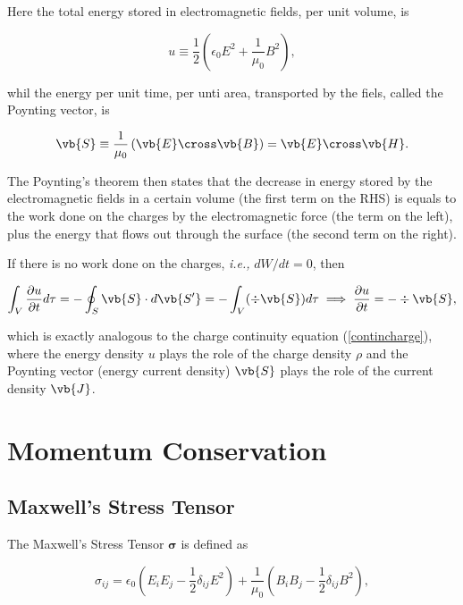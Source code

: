 \documentclass[english,a4paper,12pt]{report}
\begin{document}
Here the total energy stored in electromagnetic fields, per unit volume, is 

\begin{equation}
    u \equiv  \frac{1}{2} \left( \epsilon_0 E^2 + \frac{1}{\mu_0 } B^2  \right),
\end{equation}

whil the energy per unit time, per unti area, transported by the fiels, called the Poynting vector, is

\begin{equation}
    \vb{S} \equiv \frac{1}{\mu_0 } \left( \vb{E} \cross \vb{B}  \right)  = \vb{E} \cross \vb{H} .
\end{equation}

The Poynting's theorem then states that the decrease in energy stored by the electromagnetic fields in a certain volume (the first term on the RHS) is equals to the work done on the charges by the electromagnetic force (the term on the left), plus the energy that flows out through the surface (the second term on the right).

If there is no work done on the charges, \textit{i.e.,} \(dW /dt = 0\), then

\begin{equation}
    \int_{V}^{} \frac{\partial u}{\partial t} d\tau = -\oint_{S} \vb{S} \cdot d\vb{S'} = -\int_{V}^{} (\div{\vb{S} } ) d\tau  \implies \frac{\partial u}{\partial t} = -\div{\vb{S} },   \label{continenergy} 
\end{equation}

which is exactly analogous to the charge continuity equation (\cref{contincharge}), where the energy density \(u\) plays the role of the charge density \(\rho \) and the Poynting vector (energy current density) \(\vb{S} \) plays the role of the current density \(\vb{J} \). 

\section{Momentum Conservation}

\subsection{Maxwell's Stress Tensor}

The Maxwell's Stress Tensor \(\boldsymbol{\sigma } \) is defined as 

\begin{equation}
    \sigma _{ij}  = \epsilon_0 \left( E_{i}E_{j} - \frac{1}{2} \delta _{ij} E^2     \right) + \frac{1}{\mu_0 }\left( B_{i}B_{j} - \frac{1}{2} \delta _{ij}B^2     \right),
\end{equation}
\end{document}
